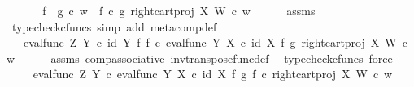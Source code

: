 \begin{isabellebody}
%
\isadelimproof
%
\endisadelimproof
%
\isatagproof
{}\isamarkupfalse%
\ {\isacharminus}{\kern0pt}\ \isanewline
\ \ \isamarkupfalse%
\ {\isachardoublequoteopen}{\isacharparenleft}{\kern0pt}f\ {\isasymbox}\ g{\isacharparenright}{\kern0pt}\ {\isasymcirc}\isactrlsub c\ w\ {\isacharequal}{\kern0pt}\ {\isacharparenleft}{\kern0pt}f\isactrlsup {\isasymflat}\ {\isasymcirc}\isactrlsub c\ {\isasymlangle}g\isactrlsup {\isasymflat}{\isacharcomma}{\kern0pt}\ right{\isacharunderscore}{\kern0pt}cart{\isacharunderscore}{\kern0pt}proj\ X\ W{\isasymrangle}{\isacharparenright}{\kern0pt}\isactrlsup {\isasymsharp}\ {\isasymcirc}\isactrlsub c\ w{\isachardoublequoteclose}\isanewline
\ \ \ \ \isamarkupfalse%
\ assms\ \isamarkupfalse%
\ {\isacharparenleft}{\kern0pt}typecheck{\isacharunderscore}{\kern0pt}cfuncs{\isacharcomma}{\kern0pt}\ simp\ add{\isacharcolon}{\kern0pt}\ meta{\isacharunderscore}{\kern0pt}comp{}{\isacharunderscore}{\kern0pt}def{}{\isacharparenright}{\kern0pt}\isanewline
\ \ \isamarkupfalse%
\ \isamarkupfalse%
\ {\isachardoublequoteopen}{\isachardot}{\kern0pt}{\isachardot}{\kern0pt}{\isachardot}{\kern0pt}\ {\isacharequal}{\kern0pt}\ {\isacharparenleft}{\kern0pt}eval{\isacharunderscore}{\kern0pt}func\ Z\ Y\ {\isasymcirc}\isactrlsub c\ {\isacharparenleft}{\kern0pt}id\ Y\ {\isasymtimes}\isactrlsub f\ f{\isacharparenright}{\kern0pt}\ {\isasymcirc}\isactrlsub c\ {\isasymlangle}eval{\isacharunderscore}{\kern0pt}func\ Y\ X\ {\isasymcirc}\isactrlsub c\ {\isacharparenleft}{\kern0pt}id\ X\ {\isasymtimes}\isactrlsub f\ g{\isacharparenright}{\kern0pt}{\isacharcomma}{\kern0pt}\ right{\isacharunderscore}{\kern0pt}cart{\isacharunderscore}{\kern0pt}proj\ X\ W{\isasymrangle}{\isacharparenright}{\kern0pt}\isactrlsup {\isasymsharp}\ {\isasymcirc}\isactrlsub c\ w{\isachardoublequoteclose}\isanewline
\ \ \ \ \isamarkupfalse%
\ assms\ comp{\isacharunderscore}{\kern0pt}associative{}\ inv{\isacharunderscore}{\kern0pt}transpose{\isacharunderscore}{\kern0pt}func{\isacharunderscore}{\kern0pt}def{}\ \isamarkupfalse%
\ {\isacharparenleft}{\kern0pt}typecheck{\isacharunderscore}{\kern0pt}cfuncs{\isacharcomma}{\kern0pt}\ force{\isacharparenright}{\kern0pt}\isanewline
\ \ \isamarkupfalse%
\ \isamarkupfalse%
\ {\isachardoublequoteopen}{\isachardot}{\kern0pt}{\isachardot}{\kern0pt}{\isachardot}{\kern0pt}\ {\isacharequal}{\kern0pt}\ {\isacharparenleft}{\kern0pt}eval{\isacharunderscore}{\kern0pt}func\ Z\ Y\ {\isasymcirc}\isactrlsub c\ {\isasymlangle}eval{\isacharunderscore}{\kern0pt}func\ Y\ X\ {\isasymcirc}\isactrlsub c\ {\isacharparenleft}{\kern0pt}id\ X\ {\isasymtimes}\isactrlsub f\ g{\isacharparenright}{\kern0pt}{\isacharcomma}{\kern0pt}\ f\ {\isasymcirc}\isactrlsub c\ right{\isacharunderscore}{\kern0pt}cart{\isacharunderscore}{\kern0pt}proj\ X\ W{\isasymrangle}{\isacharparenright}{\kern0pt}\isactrlsup {\isasymsharp}\ {\isasymcirc}\isactrlsub c\ w{\isachardoublequoteclose}\isanewline

\end{isabellebody}
